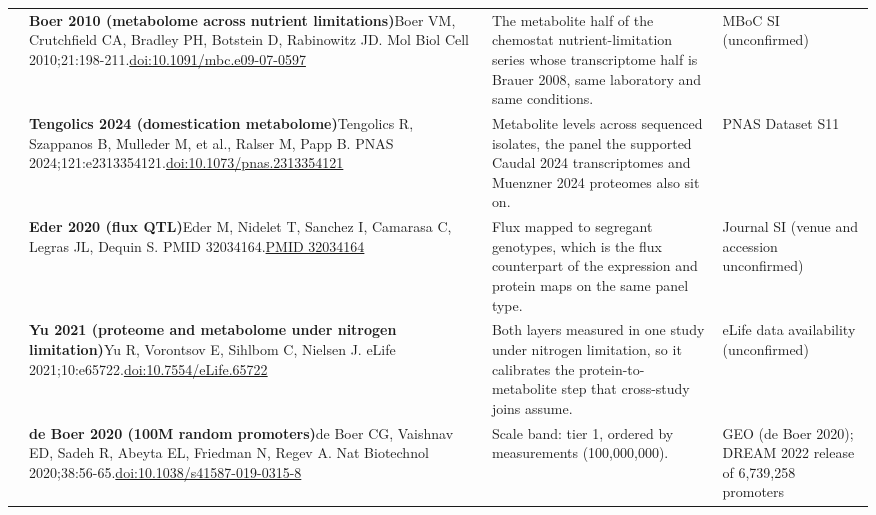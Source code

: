 \begin{landscape}
\begin{longtable}{@{}r@{\hspace{4pt}} L{86mm} L{92mm} L{62mm}@{}}
 & \textbf{Boer 2010 (metabolome across nutrient limitations)}\newline Boer VM, Crutchfield CA, Bradley PH, Botstein D, Rabinowitz JD. Mol Biol Cell 2010;21:198-211.\newline \href{https://doi.org/10.1091/mbc.e09-07-0597}{doi:10.1091/\allowbreak mbc.e09-07-0597} & The metabolite half of the chemostat nutrient-limitation series whose transcriptome half is Brauer 2008, same laboratory and same conditions. & MBoC SI (unconfirmed) \\
 & \textbf{Tengolics 2024 (domestication metabolome)}\newline Tengolics R, Szappanos B, Mulleder M, et al., Ralser M, Papp B. PNAS 2024;121:e2313354121.\newline \href{https://doi.org/10.1073/pnas.2313354121}{doi:10.1073/\allowbreak pnas.2313354121} & Metabolite levels across sequenced isolates, the panel the supported Caudal 2024 transcriptomes and Muenzner 2024 proteomes also sit on. & PNAS Dataset S11 \\
 & \textbf{Eder 2020 (flux QTL)}\newline Eder M, Nidelet T, Sanchez I, Camarasa C, Legras JL, Dequin S. PMID 32034164.\newline \href{https://pubmed.ncbi.nlm.nih.gov/32034164/}{PMID 32034164} & Flux mapped to segregant genotypes, which is the flux counterpart of the expression and protein maps on the same panel type. & Journal SI (venue and accession unconfirmed) \\
 & \textbf{Yu 2021 (proteome and metabolome under nitrogen limitation)}\newline Yu R, Vorontsov E, Sihlbom C, Nielsen J. eLife 2021;10:e65722.\newline \href{https://doi.org/10.7554/eLife.65722}{doi:10.7554/\allowbreak eLife.65722} & Both layers measured in one study under nitrogen limitation, so it calibrates the protein-to-metabolite step that cross-study joins assume. & eLife data availability (unconfirmed) \\
 & \textbf{de Boer 2020 (100M random promoters)}\newline de Boer CG, Vaishnav ED, Sadeh R, Abeyta EL, Friedman N, Regev A. Nat Biotechnol 2020;38:56-65.\newline \href{https://doi.org/10.1038/s41587-019-0315-8}{doi:10.1038/\allowbreak s41587-019-0315-8} & Scale band: tier 1, ordered by measurements (100,000,000). & GEO (de Boer 2020); DREAM 2022 release of 6,739,258 promoters \\

\end{longtable}
\end{landscape}

